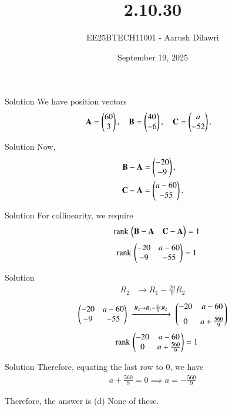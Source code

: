 \documentclass{beamer}
\title{2.10.30}
\date{September 19, 2025}
\author{EE25BTECH11001 - Aarush Dilawri}
\begin{document}
\frame{\titlepage}

\begin{frame}{Solution}
We have position vectors
\begin{align}
\mathbf{A} &= \begin{pmatrix}60 \\ 3\end{pmatrix}, \quad 
\mathbf{B} = \begin{pmatrix}40 \\ -6\end{pmatrix}, \quad 
\mathbf{C} = \begin{pmatrix}a \\ -52\end{pmatrix}.
\end{align}
\end{frame}
\begin{frame}{Solution}
    Now,
    \begin{align}
    \mathbf{B} - \mathbf{A} &= \begin{pmatrix}-20 \\ -9\end{pmatrix}, \\
    \mathbf{C} - \mathbf{A} &= \begin{pmatrix}a-60 \\ -55\end{pmatrix}.
\end{align}
\end{frame}
    
\begin{frame}{Solution}
    For collinearity, we require
\begin{align}
    \quad \text{rank}\,\begin{pmatrix}\mathbf{B}-\mathbf{A} & \mathbf{C}-\mathbf{A}\end{pmatrix} = 1
\end{align}
\begin{align}
    \quad \text{rank}\,\begin{pmatrix}-20 & a-60 \\ -9 & -55\end{pmatrix} = 1
\end{align}
\end{frame}


\begin{frame}{Solution}
\begin{align}
R_2 &\to R_1 - \tfrac{20}{9}R_2
\end{align}
\begin{align}
\begin{pmatrix}-20 & a-60 \\ -9 & -55\end{pmatrix}
\;\xrightarrow{\,R_2 \to R_1 - \frac{20}{9}R_2\,}\;
\begin{pmatrix}-20 & a-60 \\[6pt] 0 & a + \frac{560}{9}\end{pmatrix}
\end{align}
\begin{align}
    \quad \text{rank}\,\begin{pmatrix}-20 & a-60 \\ 0 & a + \frac{560}{9}\end{pmatrix} = 1
\end{align}
\end{frame}
\begin{frame}{Solution}
Therefore, equating the last row to 0, we have
\begin{align}
    a + \frac{560}{9} = 0
    \implies a = -\frac{560}{9}
\end{align}

Therefore, the answer is (d) None of these.
\end{frame}
\end{document}
